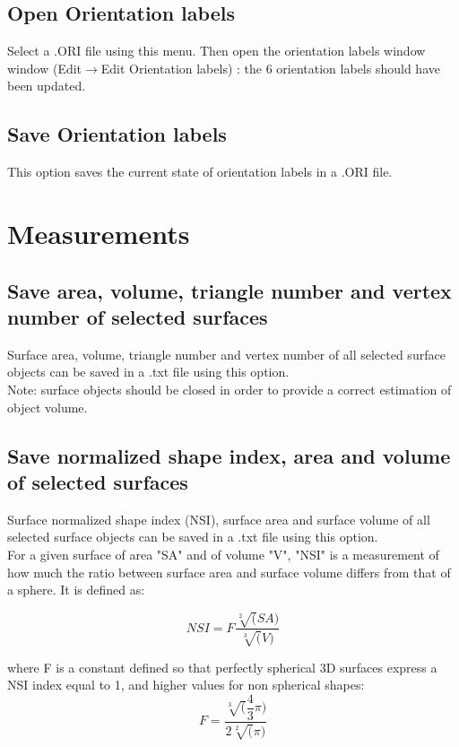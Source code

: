 \subsection{Open Orientation labels}
Select a .ORI file using this menu.  Then open the orientation labels window window (Edit$\rightarrow$Edit 
Orientation labels) : the 6 orientation labels should have been updated.

\subsection{Save Orientation labels}
This option saves the current state of orientation labels in a .ORI file.

\section{Measurements}
\subsection{Save area, volume, triangle number and vertex number of selected surfaces}
\noindent
Surface area, volume, triangle number and vertex number of all selected surface objects can be saved in a .txt file using this option.\\
\noindent Note: surface objects should be closed in order to provide a correct estimation of object volume.

\subsection{Save normalized shape index, area and volume of selected surfaces}
\noindent
Surface normalized shape index (NSI), surface area and surface volume of all selected surface objects can be saved in a .txt file using this option.\\
For a given surface of area "SA" and of volume "V", "NSI" is a measurement of how much the ratio between surface area and surface volume differs from that of a sphere. It is defined as: 

\begin{equation}
NSI = F \dfrac{\sqrt[2](SA)}{\sqrt[3](V)}
\end{equation}

where F is a constant defined so that perfectly spherical 3D surfaces express a NSI index equal to 1, and higher values for non spherical shapes:
\begin{equation}
F = \dfrac{\sqrt[3](\dfrac{4}{3}\pi)}{2\sqrt[2](\pi)}
\end{equation}
